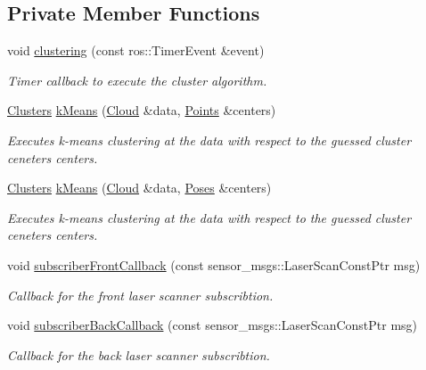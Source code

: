 \subsection*{Private Member Functions}
\begin{DoxyCompactItemize}
\item 
void \hyperlink{classLaserPredictor_a5f7f9dadce39c6060951ffefe590e834}{clustering} (const ros\+::\+Timer\+Event \&event)
\begin{DoxyCompactList}\small\item\em Timer callback to execute the cluster algorithm. \end{DoxyCompactList}\item 
\hyperlink{classLaserPredictor_ab05e971dfcde2d9abbabe861681a541c}{Clusters} \hyperlink{classLaserPredictor_aa1ba5f881fb2b50827bf6ef0802e596b}{k\+Means} (\hyperlink{classLaserPredictor_ae6d64da5bf82f544a2ea8a421af5a677}{Cloud} \&data, \hyperlink{classLaserPredictor_ae2e95d6f06a21cf4a0b0bb0e369270b4}{Points} \&centers)
\begin{DoxyCompactList}\small\item\em Executes k-\/means clustering at the data with respect to the guessed cluster ceneters centers. \end{DoxyCompactList}\item 
\hyperlink{classLaserPredictor_ab05e971dfcde2d9abbabe861681a541c}{Clusters} \hyperlink{classLaserPredictor_ab7fde5a32b1ac2dadc62aff4202a0456}{k\+Means} (\hyperlink{classLaserPredictor_ae6d64da5bf82f544a2ea8a421af5a677}{Cloud} \&data, \hyperlink{classLaserPredictor_a6c7dc6bd4bfb6acd3d95e88e1b9b4be2}{Poses} \&centers)
\begin{DoxyCompactList}\small\item\em Executes k-\/means clustering at the data with respect to the guessed cluster ceneters centers. \end{DoxyCompactList}\item 
void \hyperlink{classLaserPredictor_a58641b51a4d1120f6242b34def65d837}{subscriber\+Front\+Callback} (const sensor\+\_\+msgs\+::\+Laser\+Scan\+Const\+Ptr msg)
\begin{DoxyCompactList}\small\item\em Callback for the front laser scanner subscribtion. \end{DoxyCompactList}\item 
void \hyperlink{classLaserPredictor_a33365cf376510441f49e19588674ead2}{subscriber\+Back\+Callback} (const sensor\+\_\+msgs\+::\+Laser\+Scan\+Const\+Ptr msg)
\begin{DoxyCompactList}\small\item\em Callback for the back laser scanner subscribtion. \end{DoxyCompactList}\end{DoxyCompactItemize}
